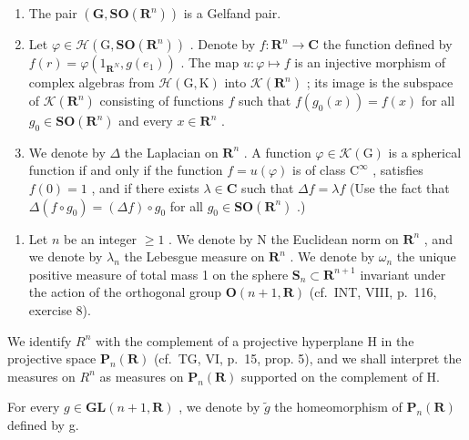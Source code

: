 \begin{enumerate}
\def\labelenumi{\alph{enumi})}
\item
  The pair \((\mathbf{G},\mathbf{SO}(\mathbf{R}^n))\) is a Gelfand pair.
\item
  Let \(\varphi \in \mathcal{H}(\mathrm{G},\mathbf{SO}(\mathbf{R}^n))\) . Denote by \(f\colon \mathbf{R}^n\to \mathbf{C}\) the function defined by \(f(r) = \varphi (1_{\mathbf{R}^N},g(e_1))\) . The map \(u\colon \varphi \mapsto f\) is an injective morphism of complex algebras from \(\mathcal{H}(\mathrm{G},\mathrm{K})\) into \(\mathcal{K}(\mathbf{R}^n)\) ; its image is the subspace of \(\mathcal{K}(\mathbf{R}^n)\) consisting of functions \(f\) such that \(f(g_0(x)) = f(x)\) for all \(g_0\in \mathbf{SO}(\mathbf{R}^n)\) and every \(x\in \mathbf{R}^n\) .
\item
  We denote by \(\Delta\) the Laplacian on \(\mathbf{R}^n\) . A function \(\varphi \in \mathcal{K}(\mathrm{G})\) is a spherical function if and only if the function \(f = u(\varphi)\) is of class \(\mathrm{C}^{\infty}\) , satisfies \(f(0) = 1\) , and if there exists \(\lambda \in \mathbf{C}\) such that \(\Delta f = \lambda f\) (Use the fact that \(\Delta(f \circ g_0) = (\Delta f) \circ g_0\) for all \(g_0 \in \mathbf{SO}(\mathbf{R}^n)\) .)
\end{enumerate}

\begin{enumerate}
\def\labelenumi{\arabic{enumi})}
\setcounter{enumi}{30}
\tightlist
\item
  Let \(n\) be an integer \(\geqslant 1\) . We denote by N the Euclidean norm on \(\mathbf{R}^n\) , and we denote by \(\lambda_n\) the Lebesgue measure on \(\mathbf{R}^n\) . We denote by \(\omega_n\) the unique positive measure of total mass 1 on the sphere \(\mathbf{S}_n \subset \mathbf{R}^{n+1}\) invariant under the action of the orthogonal group \(\mathbf{O}(n+1, \mathbf{R})\) (cf.~INT, VIII, p.~116, exercise 8).
\end{enumerate}

We identify \(R^{n}\) with the complement of a projective hyperplane H in the projective space \(\mathbf{P}_{n}(\mathbf{R})\) (cf.~TG, VI, p.~15, prop. 5), and we shall interpret the measures on \(R^{n}\) as measures on \(\mathbf{P}_{n}(\mathbf{R})\) supported on the complement of H.

For every \(g \in \mathbf{GL}(n+1, \mathbf{R})\) , we denote by \(\widetilde{g}\) the homeomorphism of \(\mathbf{P}_{n}(\mathbf{R})\) defined by g.

